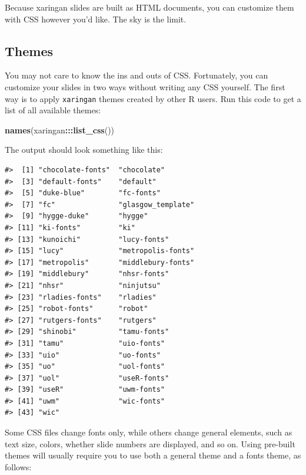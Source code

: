 \documentclass[
]{book}
\newenvironment{Shaded}{\begin{snugshade}}{\end{snugshade}}
\newcommand{\FunctionTok}[1]{\textcolor[rgb]{0.13,0.29,0.53}{\textbf{#1}}}
\newcommand{\NormalTok}[1]{#1}
\newcommand{\SpecialCharTok}[1]{\textcolor[rgb]{0.81,0.36,0.00}{\textbf{#1}}}
\begin{document}
Because xaringan slides are built as HTML documents, you can customize them with CSS however you'd like. The sky is the limit.

\hypertarget{themes}{%
\subsection*{Themes}\label{themes}}

You may not care to know the ins and outs of CSS. Fortunately, you can customize your slides in two ways without writing any CSS yourself. The first way is to apply \texttt{xaringan} themes created by other R users. Run this code to get a list of all available themes:

\begin{Shaded}
\begin{Highlighting}[]
\FunctionTok{names}\NormalTok{(xaringan}\SpecialCharTok{:::}\FunctionTok{list\_css}\NormalTok{())}
\end{Highlighting}
\end{Shaded}

The output should look something like this:

\begin{verbatim}
#>  [1] "chocolate-fonts"  "chocolate"       
#>  [3] "default-fonts"    "default"         
#>  [5] "duke-blue"        "fc-fonts"        
#>  [7] "fc"               "glasgow_template"
#>  [9] "hygge-duke"       "hygge"           
#> [11] "ki-fonts"         "ki"              
#> [13] "kunoichi"         "lucy-fonts"      
#> [15] "lucy"             "metropolis-fonts"
#> [17] "metropolis"       "middlebury-fonts"
#> [19] "middlebury"       "nhsr-fonts"      
#> [21] "nhsr"             "ninjutsu"        
#> [23] "rladies-fonts"    "rladies"         
#> [25] "robot-fonts"      "robot"           
#> [27] "rutgers-fonts"    "rutgers"         
#> [29] "shinobi"          "tamu-fonts"      
#> [31] "tamu"             "uio-fonts"       
#> [33] "uio"              "uo-fonts"        
#> [35] "uo"               "uol-fonts"       
#> [37] "uol"              "useR-fonts"      
#> [39] "useR"             "uwm-fonts"       
#> [41] "uwm"              "wic-fonts"       
#> [43] "wic"
\end{verbatim}

Some CSS files change fonts only, while others change general elements, such as text size, colors, whether slide numbers are displayed, and so on. Using pre-built themes will usually require you to use both a general theme and a fonts theme, as follows:
\end{document}
